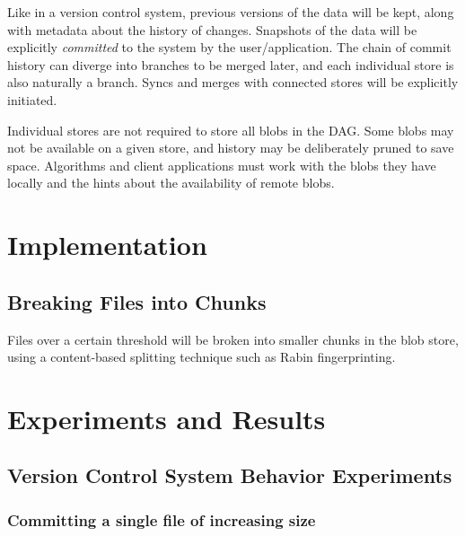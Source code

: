 \documentclass[12pt,a4paper,two-side]{book}
\newcommand{\newterm}{\textit}
\begin{document}
Like in a version control system, previous versions of the data will be kept,
along with metadata about the history of changes. Snapshots of the data will be
explicitly \newterm{committed} to the system by the user/application. The chain
of commit history can diverge into branches to be merged later, and each
individual store is also naturally a branch. Syncs and merges with connected
stores will be explicitly initiated.

Individual stores are not required to store all blobs in the DAG. Some blobs may
not be available on a given store, and history may be deliberately pruned to
save space. Algorithms and client applications must work with the blobs they
have locally and the hints about the availability of remote blobs.









\chapter{Implementation}




\section{Breaking Files into Chunks}

Files over a certain threshold will be broken into smaller chunks in the blob
store, using a content-based splitting technique such as Rabin fingerprinting.









\chapter{Experiments and Results}

\section{Version Control System Behavior Experiments}

\subsection{Committing a single file of increasing size}
\end{document}
